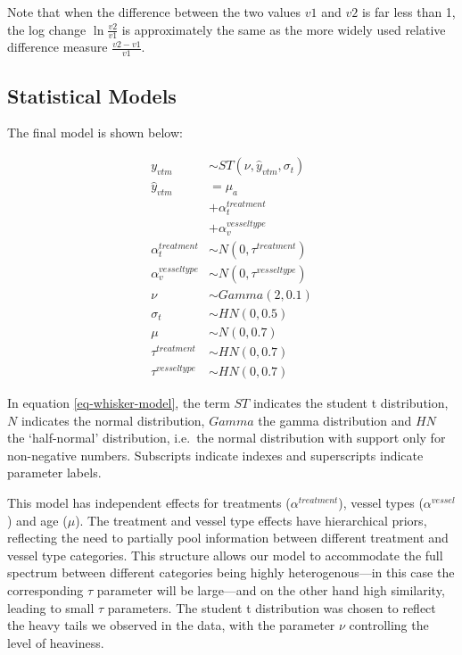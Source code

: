 \documentclass[
  letterpaper,
  DIV=11,
  numbers=noendperiod,
  oneside]{scrartcl}
\theoremstyle{plain}
\theoremstyle{remark}
\begin{document}
Note that when the difference between the two values \(v1\) and \(v2\)
is far less than 1, the log change \(\ln{\frac{v2}{v1}}\) is
approximately the same as the more widely used relative difference
measure \(\frac{v2-v1}{v1}\).

\subsection{Statistical Models}\label{statistical-models}

The final model is shown below:

\begin{align}
y_{vtm} &\sim ST(\nu, \hat{y}_{vtm}, \sigma_{t}) \label{eq-whisker-model} \\
\hat{y}_{vtm} &= \mu_a \nonumber \\
  &+ \alpha^{treatment}_{t} \nonumber \\
  &+ \alpha^{vesseltype}_v \nonumber \\
\alpha^{treatment}_t &\sim N(0, \tau^{treatment}) \nonumber \\
\alpha^{vesseltype}_v &\sim N(0, \tau^{vesseltype}) \nonumber \\
\nu &\sim Gamma(2, 0.1) \nonumber \\
\sigma_t &\sim HN(0, 0.5) \nonumber \\
\mu &\sim N(0, 0.7) \nonumber \\
\tau^{treatment} &\sim HN(0, 0.7) \nonumber \\
\tau^{vesseltype} &\sim HN(0, 0.7) \nonumber
\end{align}

In equation \eqref{eq-whisker-model}, the term \(ST\) indicates the
student t distribution, \(N\) indicates the normal distribution,
\(Gamma\) the gamma distribution and \(HN\) the `half-normal'
distribution, i.e.~the normal distribution with support only for
non-negative numbers. Subscripts indicate indexes and superscripts
indicate parameter labels.

This model has independent effects for treatments
(\(\alpha^{treatment}\)), vessel types (\(\alpha^{vessel}\)) and age
(\(\mu\)). The treatment and vessel type effects have hierarchical
priors, reflecting the need to partially pool information between
different treatment and vessel type categories. This structure allows
our model to accommodate the full spectrum between different categories
being highly heterogenous---in this case the corresponding \(\tau\)
parameter will be large---and on the other hand high similarity, leading
to small \(\tau\) parameters. The student t distribution was chosen to
reflect the heavy tails we observed in the data, with the parameter
\(\nu\) controlling the level of heaviness.
\end{document}
